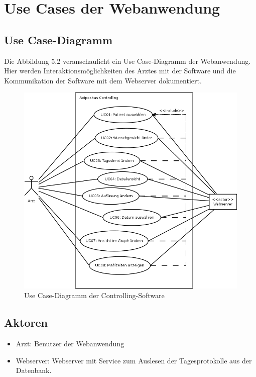 

\section{Use Cases der Webanwendung} 

\subsection{Use Case-Diagramm}

Die Abbildung 5.2 veranschaulicht ein Use Case-Diagramm der Webanwendung.
Hier werden Interaktionsm\"oglichkeiten des Arztes mit der Software und die Kommunikation der 
Software mit dem Webserver dokumentiert.\\

\begin{figure}[h]
  \centering
  \includegraphics[scale=0.55]{diagramme/kapitel5/ac_usecases.png}
  \caption{Use Case-Diagramm der Controlling-Software}
  
\end{figure}

\subsection{Aktoren}

\begin{itemize}
 \item Arzt: Benutzer der Webanwendung
 \item Webserver: Webserver mit Service zum Auslesen der Tagesprotokolle aus der Datenbank.
\end{itemize}

